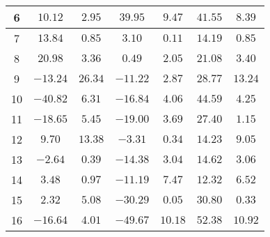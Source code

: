 \begin{table}[H]
\begin{tabular}{|c|c|c|c|c|c|c|}
                        6   &   $10.12$   &  $2.95$  &  $39.95$   &   $9.47$   &  $41.55$  &  $8.39$   \\ \hline
                        7   &   $13.84$   &  $0.85$  &  $3.10$    &   $0.11$   &  $14.19$  &  $0.85$   \\ \hline
                        8   &   $20.98$   &  $3.36$  &  $0.49$    &   $2.05$   &  $21.08$  &  $3.40$   \\ \hline
                        9   &   $-13.24$  &  $26.34$ &  $-11.22$  &   $2.87$   &  $28.77$  &  $13.24$  \\ \hline
                        10  &   $-40.82$  &  $6.31$  &  $-16.84$  &   $4.06$   &  $44.59$  &  $4.25$   \\ \hline
                        11  &   $-18.65$  &  $5.45$  &  $-19.00$  &   $3.69$   &  $27.40$  &  $1.15$   \\ \hline
                        12  &   $9.70$    &  $13.38$ &  $-3.31$   &   $0.34$   &  $14.23$  &  $9.05$   \\ \hline
                        13  &   $-2.64$   &  $0.39$  &  $-14.38$  &   $3.04$   &  $14.62$  &  $3.06$   \\ \hline
                        14  &   $3.48$    &  $0.97$  &  $-11.19$  &   $7.47$   &  $12.32$  &  $6.52$   \\ \hline
                        15  &   $2.32$    &  $5.08$  &  $-30.29$  &   $0.05$   &  $30.80$  &  $0.33$   \\ \hline
                        16  &   $-16.64$  &  $4.01$  &  $-49.67$  &   $10.18$  &  $52.38$  &  $10.92$  \\ \hline
                    \end{tabular}
    \label{tab:media_fisica_4_total}
\end{table}

\newpage
